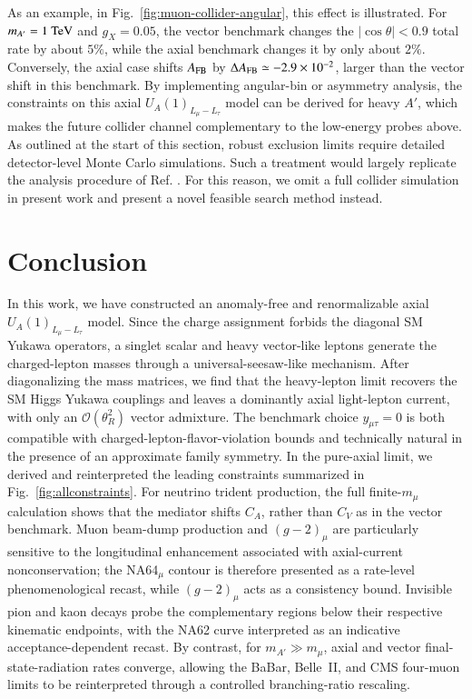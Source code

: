 \documentclass[onecolumn, aps, nofootinbib, prd, preprint, floats, floatfix, amsmath, amssymb, superscriptaddress, preprintnumbers]{revtex4-2}
\begin{document}
As an example, in Fig.~\ref{fig:muon-collider-angular}, this effect is illustrated. For $m_{A'}=1~{\rm TeV}$ and $g_X=0.05$, the vector benchmark changes the $|\cos\theta|<0.9$ total rate by about $5\%$, while the axial benchmark changes it by only about $2\%$. Conversely, the axial case shifts $A_{\rm FB}$ by $\Delta A_{\rm FB}\simeq-2.9\times10^{-2}$, larger than the vector shift in this benchmark. By implementing angular-bin or asymmetry analysis, the constraints on this axial $U_A(1)_{L_\mu-L_\tau}$ model can be derived for heavy $A'$, which makes the future collider channel complementary to the low-energy probes above. As outlined at the start of this section, robust exclusion limits require detailed detector-level Monte Carlo simulations. Such a treatment would largely replicate the analysis procedure of Ref. \cite{Huang:2021nkl}. For this reason, we omit a full collider simulation in present work and present a novel feasible search method instead.


\section{Conclusion}
\label{sec:conclusion}

In this work, we have constructed an anomaly-free and renormalizable axial $U_A(1)_{L_\mu-L_\tau}$ model. Since the charge assignment forbids the diagonal SM Yukawa operators, a singlet scalar and heavy vector-like leptons generate the charged-lepton masses through a universal-seesaw-like mechanism. After diagonalizing the mass matrices, we find that the heavy-lepton limit recovers the SM Higgs Yukawa couplings and leaves a dominantly axial light-lepton current, with only an $\mathcal O(\theta_R^2)$ vector admixture. The benchmark choice $y_{\mu\tau}=0$ is both compatible with charged-lepton-flavor-violation bounds and technically natural in the presence of an approximate family symmetry.
In the pure-axial limit, we derived and reinterpreted the leading constraints summarized in Fig.~\ref{fig:allconstraints}. For neutrino trident production, the full finite-$m_\mu$ calculation shows that the mediator shifts $C_A$, rather than $C_V$ as in the vector benchmark. Muon beam-dump production and $(g-2)_\mu$ are particularly sensitive to the longitudinal enhancement associated with axial-current nonconservation; the NA64$_\mu$ contour is therefore presented as a rate-level phenomenological recast, while $(g-2)_\mu$ acts as a consistency bound. Invisible pion and kaon decays probe the complementary regions below their respective kinematic endpoints, with the NA62 curve interpreted as an indicative acceptance-dependent recast. By contrast, for $m_{A'}\gg m_\mu$, axial and vector final-state-radiation rates converge, allowing the BaBar, Belle~II, and CMS four-muon limits to be reinterpreted through a controlled branching-ratio rescaling.
\end{document}
